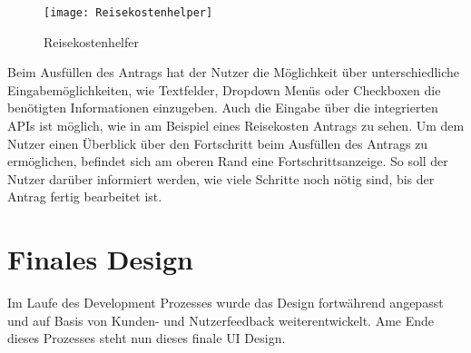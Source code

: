 \begin{figure}[h]
  \centering
    \texttt{[image: Reisekostenhelper]}
    \caption{Reisekostenhelfer}\label{Reisekostenhelfer}
\end{figure}


Beim Ausfüllen des Antrags hat der Nutzer die Möglichkeit über unterschiedliche Eingabemöglichkeiten,
wie Textfelder, Dropdown Menüs oder Checkboxen die benötigten Informationen einzugeben. Auch die Eingabe
über die integrierten \ac{API}s ist möglich, wie in  am Beispiel eines Reisekosten Antrags zu sehen.
Um dem Nutzer einen Überblick über den Fortschritt beim Ausfüllen des Antrags zu ermöglichen, befindet sich am oberen 
Rand eine Fortschrittsanzeige.
So soll der Nutzer darüber informiert werden, wie viele Schritte noch
nötig sind, bis der Antrag fertig bearbeitet ist. 


\section{Finales Design}\label{Finales Design}
Im Laufe des Development Prozesses wurde das Design fortwährend angepasst und auf Basis
von Kunden- und Nutzerfeedback weiterentwickelt. Ame Ende dieses Prozesses steht nun 
dieses finale \ac{UI} Design.




